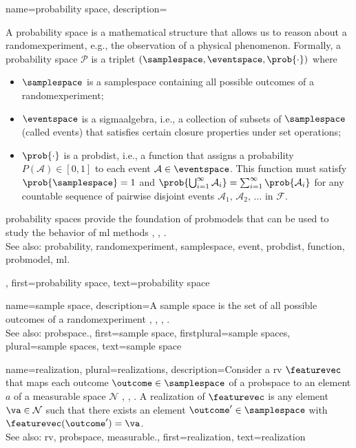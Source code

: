  {name={probability space}, 
 	description={A \gls{probability} space is a mathematical 
 		structure that allows us to reason about a \gls{randomexperiment}, e.g., the observation 
		of a physical phenomenon. 
 	   	Formally, a \gls{probability} space $\mathcal{P}$ is a triplet $(\samplespace, \eventspace, \prob{\cdot})$ where
 		\begin{itemize} 
 			\item  $\samplespace$ is a \gls{samplespace} containing all possible outcomes of a \gls{randomexperiment};
 			\item  $\eventspace$ is a \gls{sigmaalgebra}, i.e., a collection of subsets of 
			$\samplespace$ (called \glspl{event}) that satisfies certain closure properties under set operations;
 			\item $\prob{\cdot}$ is a \gls{probdist}, i.e., a \gls{function} that assigns a \gls{probability} $P(\mathcal{A}) \in [0,1]$ 
 			to each \gls{event} $\mathcal{A} \in \eventspace$. This \gls{function} must satisfy $\prob{\samplespace} = 1$ and 
			$\prob{\bigcup_{i=1}^{\infty} \mathcal{A}_i} = \sum_{i=1}^{\infty} \prob{\mathcal{A}_i}$ for any 
 			countable sequence of pairwise disjoint \glspl{event} $\mathcal{A}_1, \,\mathcal{A}_2, \,\ldots$ in $\mathcal{F}$.
 		\end{itemize}
 		\Gls{probability} spaces provide the foundation of \glspl{probmodel} that can be 
		used to study the behavior of \gls{ml} methods \cite{BillingsleyProbMeasure}, \cite{GrayProbBook}, \cite{ross2013first}.
				\\
		See also: \gls{probability}, \gls{randomexperiment}, \gls{samplespace}, \gls{event}, \gls{probdist}, \gls{function}, \gls{probmodel}, \gls{ml}.},  
 	first={probability space}, 
 	text={probability space}
 }
 
 
  {name={sample space}, 
  	description={A \gls{sample} space is the set of all possible 
		outcomes of a \gls{randomexperiment} \cite{BillingsleyProbMeasure}, 
		\cite{BertsekasProb}, \cite{papoulis}, \cite{AshProbMeasure}. 
		\\
 		See also: \gls{probspace}.},  
  	first={sample space}, 
 	firstplural={sample spaces},
 	plural={sample spaces},
  	text={sample space}
  }
 
	
{name={realization}, plural={realizations},
	description={Consider a \gls{rv} $\featurevec$ that maps each outcome 
		$\outcome \in \samplespace$ of a \gls{probspace} to an element $a$ of a 
		\gls{measurable} space $\mathcal{N}$ \cite{RudinBookPrinciplesMatheAnalysis}, \cite{BillingsleyProbMeasure}, \cite{HalmosMeasure}. 
		A realization of $\featurevec$ is any element $\va \in \mathcal{N}$ such that there exists 
		an element $\outcome' \in \samplespace$ with $\featurevec(\outcome') = \va$.
			\\
		See also: \gls{rv}, \gls{probspace}, \gls{measurable}.}, 
	first={realization},
	text={realization}  
}

